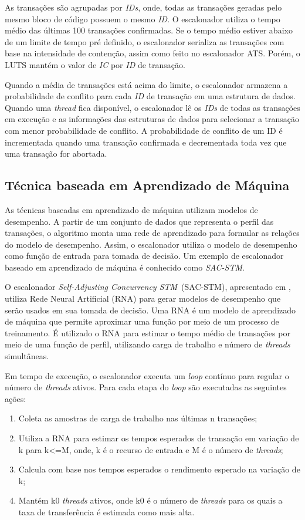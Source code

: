 \documentclass[ti]{texufpel}
\begin{document}
As transações são agrupadas por \emph{IDs}, onde, todas as transações geradas pelo mesmo bloco de código possuem o mesmo \emph{ID}. O escalonador utiliza o tempo médio das últimas 100 transações confirmadas. Se o tempo médio estiver abaixo de um limite de tempo pré definido, o escalonador serializa as transações com base na intensidade de contenção, assim como feito no escalonador ATS. Porém, o LUTS mantém o valor de \emph{IC} por \emph{ID} de transação.

Quando a média de transações está acima do limite, o escalonador armazena a probabilidade de conflito para cada \emph{ID} de transação em uma estrutura de dados. Quando uma \emph{thread} fica disponível, o escalonador lê os \emph{IDs} de todas as transações em execução e as informações das estruturas de dados para selecionar a transação com menor probabilidade de conflito. A probabilidade de conflito de um ID é incrementada quando uma transação confirmada e decrementada toda vez que uma transação for abortada.

\subsection{Técnica baseada em Aprendizado de Máquina}

As técnicas baseadas em aprendizado de máquina utilizam modelos de desempenho. A partir de um conjunto de dados que representa o perfil das transações, o algoritmo monta uma rede de aprendizado para formular as relações do modelo de desempenho. Assim, o escalonador utiliza o modelo de desempenho como função de entrada para tomada de decisão. Um exemplo de escalonador baseado em aprendizado de máquina é conhecido como \emph{SAC-STM}.

O escalonador \emph{Self-Adjusting Concurrency STM}~(SAC-STM), apresentado em \cite{rughetti12}, utiliza Rede Neural Artificial (RNA) para gerar modelos de desempenho que serão usados em sua tomada de decisão. Uma RNA é um modelo de aprendizado de máquina que permite aproximar uma função por meio de um processo de treinamento. É utilizado o RNA para estimar o tempo médio de transações por meio de uma função de perfil, utilizando carga de trabalho e número de \emph{threads} simultâneas.

Em tempo de execução, o escalonador executa um \emph{loop} contínuo para regular o número de \emph{threads} ativos. Para cada etapa do \emph{loop} são executadas as seguintes ações:

\begin{enumerate}
 \item Coleta as amostras de carga de trabalho nas últimas n transações;
 \item Utiliza a RNA para estimar os tempos esperados de transação em variação de k para k<=M, onde, k é o recurso de entrada e M é o número de \emph{threads};
 \item Calcula com base nos tempos esperados o rendimento esperado na variação de k;
 \item Mantém k0 \emph{threads} ativos, onde k0 é o número de \emph{threads} para os quais a taxa de transferência é estimada como mais alta.
\end{enumerate}
\end{document}
